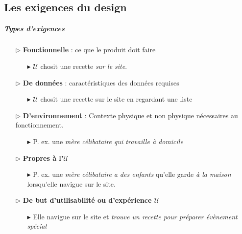 \documentclass{report}
\begin{document}
\begin{multicols*}{3}
    \chapter{Les exigences du design}


    \paragraph{Types d'exigences}
    \begin{itemize}
      \item [$\rhd$ ] \textbf{Fonctionnelle} : ce que le produit 
        doit faire
        \begin{itemize}
          \item [$\blacktriangleright$ ] $\mathcal{U}$ 
            \textcolor{myg}{chosit 
            une recette} \textit{sur le site}.
        \end{itemize}
       \item [$\rhd$ ] \textbf{De données} : caractéristiques des 
         données requises 
        \begin{itemize}
          \item [$\blacktriangleright$ ] $\mathcal{U}$ chosit 
            une recette sur le site en regardant une 
            \textcolor{myg}{liste}  
        \end{itemize}
      \item [$\rhd$ ] \textbf{D'environnement}  :  Contexte
        physique 
        et non physique nécessaires au fonctionnement. 
        \begin{itemize}
          \item [$\blacktriangleright$ ] P. ex. 
            une \textit{mère célibataire qui 
            \textcolor{myg}{travaille à domicile}}  
        \end{itemize}
      \item [$\rhd$ ] \textbf{Propres à l'$\mathcal{U}$}   
        \begin{itemize}
          \item [$\blacktriangleright$ ] P. ex. une 
            \textit{\textcolor{myg}{mère célibataire}} 
            \textit{a des \textcolor{myg}{enfants}} 
            qu'elle garde \textit{\textcolor{myg}{à la maison}}  
            lorsqu'elle navigue sur le site. 
        \end{itemize}
      \item[$\rhd $] \textbf{De but d'utilisabilité ou d'expérience 
        $\mathcal{U}$}
        \begin{itemize}
          \item [$\blacktriangleright $] Elle navigue sur le site 
            et \textit{trouve un recette \textcolor{myg}{pour 
            préparer évènement spécial}}  
        \end{itemize}


\end{itemize}
\end{multicols*}
\end{document}

